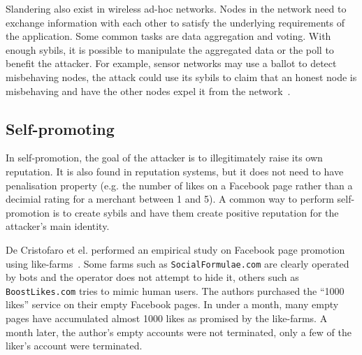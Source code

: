Slandering also exist in wireless ad-hoc networks. Nodes in the network need to
exchange information with each other to satisfy the underlying requirements of
the application. Some common tasks are data aggregation and voting. With enough
sybils, it is possible to manipulate the aggregated data or the poll to benefit
the attacker. For example, sensor networks may use a ballot to detect
misbehaving nodes, the attack could use its sybils to claim that an honest node
is misbehaving and have the other nodes expel it from the
network~\cite{newsome2004sybil}.

\subsection{Self-promoting}
In self-promotion, the goal of the attacker is to illegitimately raise its own
reputation. It is also found in reputation systems, but it does not need to have
penalisation property (e.g. the number of likes on a Facebook page rather than a
decimial rating for a merchant between 1 and 5). A common way to perform
self-promotion is to create sybils and have them create positive reputation for
the attacker's main identity.

\begin{comment}
Dini and Spagnolo studied the economics of buying reputation on eBay. The
authors discovered many cheap items (around \euro{0.7}) for sell are simply there to
boost feedback. For example, one of the item is titled ``Apple Cranberry Crisp
Recipe + 100\% Positive Feedback''. The authors successfully boosted their
feedback by purchasing such items. But they made an unsuccessful attempted to
place a bid on their own good with a fake account~\cite{dini2009buying}.
\end{comment}


De Cristofaro et el. performed an empirical study on Facebook page promotion
using like-farms~\cite{de2014paying}. Some farms such as
\verb!SocialFormulae.com! are clearly operated by bots and the operator does not
attempt to hide it, others such as \verb!BoostLikes.com! tries to mimic human
users. The authors purchased the ``1000 likes'' service on their empty Facebook
pages. In under a month, many empty pages have accumulated almost 1000 likes as
promised by the like-farms. A month later, the author's empty accounts were not
terminated, only a few of the liker's account were terminated.

